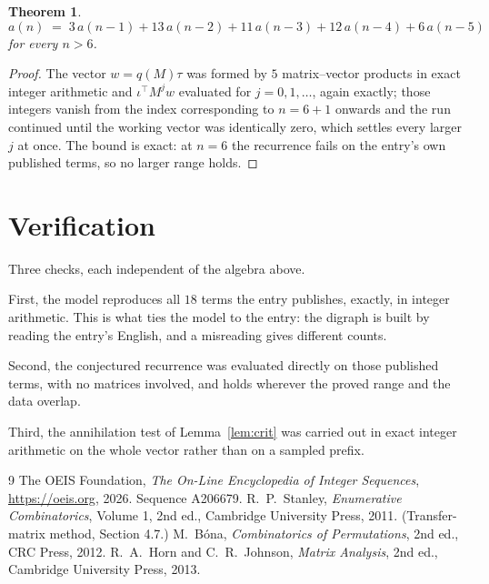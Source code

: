 \documentclass[11pt,a4paper]{article}
\theoremstyle{plain}
\newtheorem{theorem}{Theorem}
\theoremstyle{definition}
\begin{document}
\begin{theorem}
\[
a(n)\;=\;3\,a(n-1) + 13\,a(n-2) + 11\,a(n-3) + 12\,a(n-4) + 6\,a(n-5)
\]
for every $n>6$.
\end{theorem}

\begin{proof}
The vector $w=q(M)\tau$ was formed by $5$ matrix--vector products in exact integer
arithmetic and $\iota^{\!\top}M^{j}w$ evaluated for $j=0,1,\dots$, again exactly; those
integers vanish from the index corresponding to $n=6+1$ onwards and the run continued
until the working vector was identically zero, which settles every larger $j$ at once. The bound is exact: at $n=6$ the recurrence fails on the entry's own published terms, so no larger range holds.
\end{proof}

\section{Verification}

Three checks, each independent of the algebra above.

First, the model reproduces all $18$ terms the entry publishes, exactly, in integer
arithmetic. This is what ties the model to the entry: the digraph is built by reading the
entry's English, and a misreading gives different counts.

Second, the conjectured recurrence was evaluated directly on those published terms, with no
matrices involved, and holds wherever the proved range and the data overlap.

Third, the annihilation test of Lemma~\ref{lem:crit} was carried out in exact integer
arithmetic on the whole vector rather than on a sampled prefix.

\begin{thebibliography}{9}
 The OEIS Foundation, \emph{The On-Line Encyclopedia of Integer
Sequences}, \url{https://oeis.org}, 2026. Sequence A206679.
 R.~P.~Stanley, \emph{Enumerative Combinatorics}, Volume 1, 2nd ed.,
Cambridge University Press, 2011. (Transfer-matrix method, Section 4.7.)
 M.~B\'ona, \emph{Combinatorics of Permutations}, 2nd ed., CRC
Press, 2012.
 R.~A.~Horn and C.~R.~Johnson, \emph{Matrix Analysis}, 2nd ed., Cambridge
University Press, 2013.
\end{thebibliography}
\end{document}
